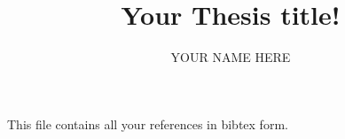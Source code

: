 \documentclass[10pt,a4paper]{book}
\title{Your Thesis title!}
\author{YOUR NAME HERE}					%
\begin{document}
	\frontmatter 
	\pagestyle{empty}
	
	\maketitle 
	\makecertificate{} 
	\tableofcontents 
	\listoffigures 
	\listoftables 
	
	
	\mainmatter 
	\pagestyle{fancy} 
	
	
	\appendix
	
	This file contains all your references in bibtex form.
						
	
\end{document}

